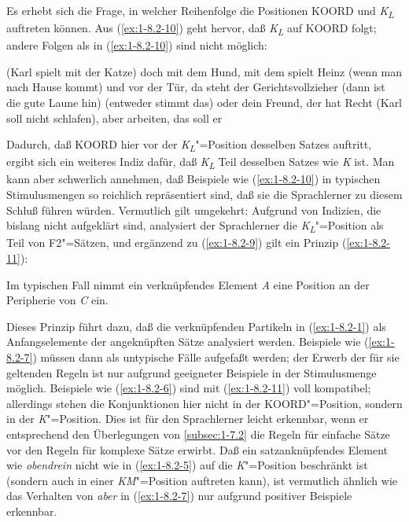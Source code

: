 \documentclass[output=paper]{langsci/langscibook}
\begin{document}
Es erhebt sich die Frage, in welcher Reihenfolge die Positionen KOORD und \textit{K\textsubscript{L}}
auftreten können. Aus (\ref{ex:1-8.2-10}) geht hervor, daß \textit{K\textsubscript{L}} auf KOORD folgt; andere Folgen als
in (\ref{ex:1-8.2-10}) sind nicht möglich:
\begin{exe}
\ex\label{ex:1-8.2-10}
\begin{xlist}
\ex\label{ex:1-8.2-10a}  (Karl spielt mit der Katze) doch mit dem Hund, mit dem spielt Heinz
\ex\label{ex:1-8.2-10b} (wenn man nach Hause kommt) und vor der Tür, da steht der Gerichtsvollzieher (dann ist die gute Laune hin)
\ex\label{ex:1-8.2-10c} (entweder stimmt das) oder dein Freund, der hat Recht
\ex\label{ex:1-8.2-10d} (Karl soll nicht schlafen), aber arbeiten, das soll er
\end{xlist}
\end{exe}
Dadurch, daß KOORD hier vor der \textit{K\textsubscript{L}}"=Position
desselben Satzes auftritt, ergibt sich ein weiteres Indiz dafür, daß
\textit{K\textsubscript{L}} Teil desselben Satzes wie \textit{K}
ist. Man kann aber schwerlich annehmen, daß Beispiele wie
(\ref{ex:1-8.2-10}) in typischen Stimulusmengen so reichlich
repräsentiert sind, daß sie die Sprachlerner zu diesem Schluß führen
würden. Vermutlich gilt umgekehrt: Aufgrund von Indizien, die bislang
nicht aufgeklärt sind, analysiert der Sprachlerner die
\textit{K\textsubscript{L}}"=Position als Teil von F2"=Sätzen, und
ergänzend zu (\ref{ex:1-8.2-9}) gilt ein Prinzip (\ref{ex:1-8.2-11}):
\begin{exe}
\ex\label{ex:1-8.2-11}
Im typischen Fall nimmt ein verknüpfendes Element \textit{A} eine Position an
der Peripherie von \textit{C} ein.
\end{exe}
Dieses Prinzip führt dazu, daß die verknüpfenden Partikeln in
(\ref{ex:1-8.2-1}) als Anfangselemente der angeknüpften Sätze
analysiert werden. Beispiele wie (\ref{ex:1-8.2-7}) müssen dann als
untypische Fälle aufgefaßt werden; der Erwerb der für sie geltenden
Regeln ist nur aufgrund geeigneter Beispiele in der Stimulusmenge
möglich. Beispiele wie (\ref{ex:1-8.2-6}) sind mit (\ref{ex:1-8.2-11})
voll kompatibel; allerdings stehen die Konjunktionen hier nicht in der
KOORD"=Position, sondern in der \textit{K}"=Position. Dies ist für den Sprachlerner leicht erkennbar, wenn er entsprechend den Überlegungen von \ref{subsec:1-7.2} die Regeln für einfache
Sätze vor den Regeln für komplexe Sätze erwirbt. Daß ein satzanknüpfendes Element wie \textit{obendrein} nicht wie in (\ref{ex:1-8.2-5}) auf die \textit{K}"=Position beschränkt ist (sondern
auch in einer \textit{KM}"=Position auftreten kann), ist vermutlich ähnlich wie das Verhalten
von \textit{aber} in (\ref{ex:1-8.2-7}) nur aufgrund positiver Beispiele erkennbar.
\end{document}
